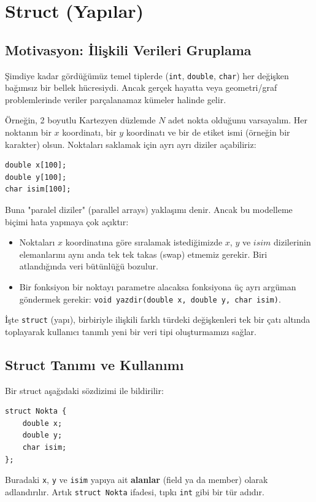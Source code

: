 \section{Struct (Yapılar)}

\subsection{Motivasyon: İlişkili Verileri Gruplama}

Şimdiye kadar gördüğümüz temel tiplerde (\lstinline|int|, \lstinline|double|, \lstinline|char|) her değişken bağımsız bir bellek hücresiydi. Ancak gerçek hayatta veya geometri/graf problemlerinde veriler parçalanamaz kümeler halinde gelir.

Örneğin, 2 boyutlu Kartezyen düzlemde $N$ adet nokta olduğunu varsayalım. Her noktanın bir $x$ koordinatı, bir $y$ koordinatı ve bir de etiket ismi (örneğin bir karakter) olsun. Noktaları saklamak için ayrı ayrı diziler açabiliriz:
\begin{lstlisting}[language=CTemel]
double x[100];
double y[100];
char isim[100];
\end{lstlisting}
Buna "paralel diziler" (parallel arrays) yaklaşımı denir. Ancak bu modelleme biçimi hata yapmaya çok açıktır:
\begin{itemize}
    \item Noktaları $x$ koordinatına göre sıralamak istediğimizde $x$, $y$ ve $isim$ dizilerinin elemanlarını aynı anda tek tek takas (swap) etmemiz gerekir. Biri atlandığında veri bütünlüğü bozulur.
    \item Bir fonksiyon bir noktayı parametre alacaksa fonksiyona üç ayrı argüman göndermek gerekir: \lstinline|void yazdir(double x, double y, char isim)|.
\end{itemize}

İşte \lstinline|struct| (yapı), birbiriyle ilişkili farklı türdeki değişkenleri tek bir çatı altında toplayarak kullanıcı tanımlı yeni bir veri tipi oluşturmamızı sağlar.

\subsection{Struct Tanımı ve Kullanımı}

\begin{definition}
Bir struct aşağıdaki sözdizimi ile bildirilir:
\begin{lstlisting}[language=CTemel]
struct Nokta {
    double x;
    double y;
    char isim;
};
\end{lstlisting}
Buradaki \lstinline|x|, \lstinline|y| ve \lstinline|isim| yapıya ait \textbf{alanlar} (field ya da member) olarak adlandırılır. Artık \lstinline|struct Nokta| ifadesi, tıpkı \lstinline|int| gibi bir tür adıdır.
\end{definition}

